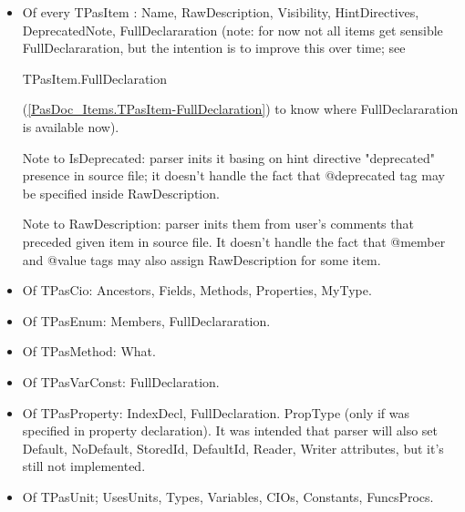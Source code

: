 \documentclass{report}
\begin{document}
\begin{itemize}
\item Of every TPasItem : Name, RawDescription, Visibility, HintDirectives, DeprecatedNote, FullDeclararation (note: for now not all items get sensible FullDeclararation, but the intention is to improve this over time; see \begin{ttfamily}TPasItem.FullDeclaration\end{ttfamily}(\ref{PasDoc_Items.TPasItem-FullDeclaration}) to know where FullDeclararation is available now).

Note to IsDeprecated: parser inits it basing on hint directive "deprecated" presence in source file; it doesn't handle the fact that @deprecated tag may be specified inside RawDescription.

Note to RawDescription: parser inits them from user's comments that preceded given item in source file. It doesn't handle the fact that @member and @value tags may also assign RawDescription for some item.
\item Of TPasCio: Ancestors, Fields, Methods, Properties, MyType.
\item Of TPasEnum: Members, FullDeclararation.
\item Of TPasMethod: What.
\item Of TPasVarConst: FullDeclaration.
\item Of TPasProperty: IndexDecl, FullDeclaration. PropType (only if was specified in property declaration). It was intended that parser will also set Default, NoDefault, StoredId, DefaultId, Reader, Writer attributes, but it's still not implemented.
\item Of TPasUnit; UsesUnits, Types, Variables, CIOs, Constants, FuncsProcs.
\end{itemize}
\end{document}
